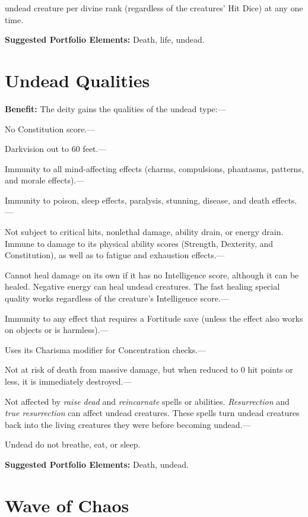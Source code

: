 \documentclass{article}
\begin{document}
undead creature per divine rank (regardless of the creatures' Hit Dice) at any 
one time.

\textbf{Suggested Portfolio Elements:} Death, life, undead.

\vspace{12pt}
\section*{Undead Qualities}

\textbf{Benefit:} The deity gains the qualities of the undead type:---

No Constitution score.---

Darkvision out to 60 feet.---

Immunity to all mind-affecting effects (charms, compulsions, phantasms, patterns, 
and morale effects).---

Immunity to poison, sleep effects, paralysis, stunning, disease, and death effects.---

Not subject to critical hits, nonlethal damage, ability drain, or energy drain. 
Immune to damage to its physical ability scores (Strength, Dexterity, and Constitution), 
as well as to fatigue and exhaustion effects.---

Cannot heal damage on its own if it has no Intelligence score, although it can 
be healed. Negative energy can heal undead creatures. The fast healing special 
quality works regardless of the creature's Intelligence score.---

Immunity to any effect that requires a Fortitude save (unless the effect also works 
on objects or is harmless).---

Uses its Charisma modifier for Concentration checks.---

Not at risk of death from massive damage, but when reduced to 0 hit points or less, 
it is immediately destroyed.---

Not affected by \textit{raise dead }and \textit{reincarnate }spells or abilities. 
\textit{Resurrection }and \textit{true resurrection }can affect undead creatures. 
These spells turn undead creatures back into the living creatures they were before 
becoming undead.---

Undead do not breathe, eat, or sleep.

\textbf{Suggested Portfolio Elements:} Death, undead.

\vspace{12pt}
\section*{Wave of Chaos}
\end{document}
